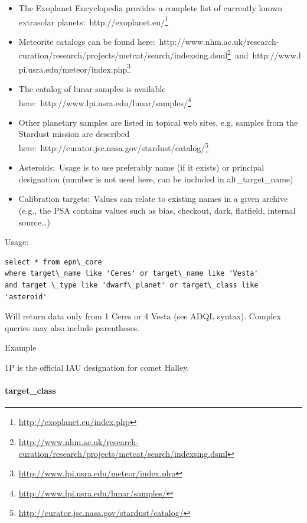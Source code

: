 \documentclass[11pt,a4paper]{ivoa}
\begin{document}
\begin{itemize}
\item The Exoplanet Encyclopedia provides a complete list of currently known extrasolar planets: http://exoplanet.eu/\footnote{\url{http://exoplanet.eu/index.php}}
\item Meteorite catalogs can be found here: http://www.nhm.ac.uk/research-curation/research/projects/metcat/search/indexsing.dsml\footnote{\url{http://www.nhm.ac.uk/research-curation/research/projects/metcat/search/indexsing.dsml}} and http://www.lpi.usra.edu/meteor/index.php\footnote{\url{http://www.lpi.usra.edu/meteor/index.php}}
\item The catalog of lunar samples is available here: http://www.lpi.usra.edu/lunar/samples/\footnote{\url{http://www.lpi.usra.edu/lunar/samples/}}
\item Other planetary samples are listed in topical web sites, e.g. samples from the Stardust mission are described here: http://curator.jsc.nasa.gov/stardust/catalog/\footnote{\url{http://curator.jsc.nasa.gov/stardust/catalog/}}
\item Asteroids: Usage is to use preferably name (if it exists) or principal designation (number is not used here, can be included in alt\_target\_name)
\item Calibration targets: Values can relate to existing names in a given archive (e.g., the PSA contains values such as bias, checkout, dark, flatfield, internal source…)
\end{itemize}

Usage:






\begin{verbatim}select * from epn\_core 
where target\_name like 'Ceres' or target\_name like 'Vesta' 
and target \_type like 'dwarf\_planet' or target\_class like 'asteroid'\end{verbatim}




Will return data only from 1 Ceres or 4 Vesta (see ADQL syntax). Complex queries may also include parentheses.

Example

1P is the official IAU designation for comet Halley.

\paragraph{target\_class}
\end{document}
